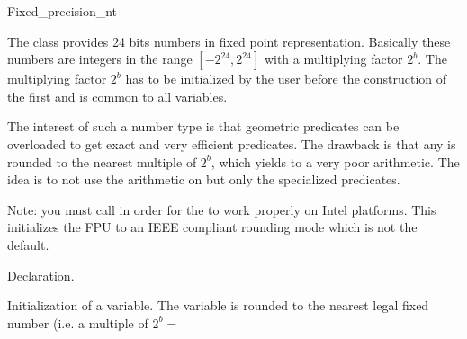 
%
%
%
%

\begin{ccClass}{Fixed_precision_nt}

\label{I1_Chapter_Fixed_precision_nt}

The class  provides 24 bits numbers in 
fixed point representation.
Basically these numbers are integers in the range
$[-2^{24},2^{24}]$ with a multiplying factor $2^b$.
The multiplying factor $2^b$ has to be initialized by the user
before the construction of the first 
and is common to all variables.

The interest of such a number type is that geometric predicates
can be overloaded to get exact and very efficient predicates.
The drawback is that any  is rounded to 
the nearest multiple of $2^b$, which yields to a very poor arithmetic.
The idea is to not use the arithmetic on 
but only the specialized predicates.

Note: you must call  in order for the
 to work properly on Intel platforms.  This
initializes the FPU to an IEEE compliant rounding mode which is not the
default.

\ccSetTwoColumns{}{\hspace*{8.5cm}}

\ccCreation
{}


            {Declaration.}

            {Initialization of a variable. The variable is rounded to the
                nearest legal fixed number (i.e. a multiple of $2^b=$
                }



\end{ccClass}
